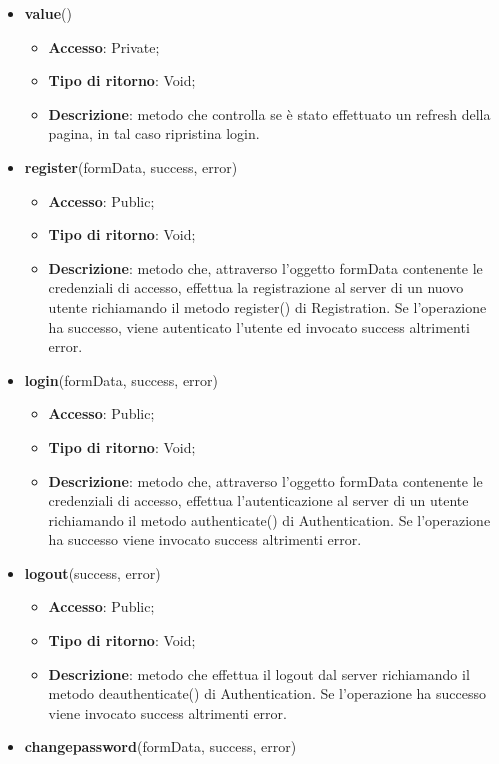 {{{\begin{itemize}
				\item \textbf{value}()
				\begin{itemize}
					\item \textbf{Accesso}: Private;
					\item \textbf{Tipo di ritorno}: Void;
					\item \textbf{Descrizione}: metodo che controlla se è stato effettuato un refresh della pagina, in tal caso ripristina login.
				\end{itemize}
				\item \textbf{register}(formData, success, error)
				\begin{itemize}
					\item \textbf{Accesso}: Public;
					\item \textbf{Tipo di ritorno}: Void;
					\item \textbf{Descrizione}: metodo che, attraverso l'oggetto formData contenente le credenziali di accesso, effettua la registrazione al server di un nuovo utente richiamando il metodo register() di Registration. Se l'operazione ha successo, viene autenticato l'utente ed invocato success altrimenti error.
				\end{itemize}
				\item \textbf{login}(formData, success, error)
				\begin{itemize}
					\item \textbf{Accesso}: Public;
					\item \textbf{Tipo di ritorno}: Void;
					\item \textbf{Descrizione}: metodo che, attraverso l'oggetto formData contenente le credenziali di accesso, effettua l'autenticazione al server di un utente richiamando il metodo authenticate() di Authentication. Se l'operazione ha successo viene invocato success altrimenti error.
				\end{itemize}
				\item \textbf{logout}(success, error)
				\begin{itemize}
					\item \textbf{Accesso}: Public;
					\item \textbf{Tipo di ritorno}: Void;
					\item \textbf{Descrizione}: metodo che effettua il logout dal server richiamando il metodo deauthenticate() di Authentication. Se l'operazione ha successo viene invocato success altrimenti error.
				\end{itemize}
				\item \textbf{changepassword}(formData, success, error)

\end{itemize}}}}
